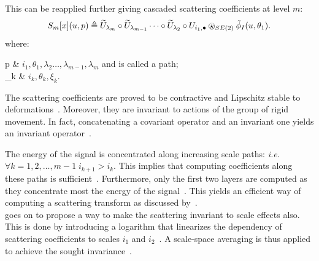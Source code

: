                     This can be reapplied further giving cascaded scattering coefficients at level $m$:
                    \begin{equation}
                        \label{eq::scatter_second}
                        S_m[x](u, p) \triangleq \widetilde{U}_{\lambda_m} \circ \widetilde{U}_{\lambda_{m-1}} \dots \circ \widetilde{U}_{\lambda_2} \circ U_{i_1, \bullet} \ostar_{SE(2)} \tilde{\phi}_I(u, \theta_1).
                    \end{equation}
                    where:
                    \begin{conditions}
                        p & $i_1, \theta_1, \lambda_2 \dots, \lambda_{m-1}, \lambda_m$ and is called a path;\\
                        \lambda_k & $i_k, \theta_k, \xi_k$.
                    \end{conditions}

                    The scattering coefficients are proved to be contractive and Lipschitz stable to deformations~\parencite{mallat2012group}.
                    Moreover, they are invariant to actions of the group of rigid movement.
                    In fact, concatenating a covariant operator and an invariant one yields an invariant operator~\parencite{mallat2012group,sifre2013rotation}.

                    The energy of the signal is concentrated along increasing scale paths: \textit{i.e.} $\forall k=1,2,\dots,m-1 \; i_{k+1} > i_k$.
                    This implies that computing coefficients along these paths is sufficient~\parencite{bruna2013invariant,sifre2013rotation,oyallon2015deep}.
                    Furthermore, only the first two layers are computed as they concentrate most the energy of the signal~\parencite{bruna2013invariant,sifre2013rotation,oyallon2015deep}.
                    This yields an efficient way of computing a scattering transform as discussed by~\textcite{sifre2013rotation,oyallon2015deep}.\\

                    \textcite{sifre2013rotation} goes on to propose a way to make the scattering invariant to scale effects also.
                    This is done by introducing a logarithm that linearizes the dependency of scattering coefficients to scales $i_1$ and $i_2$~\parencite{sifre2013rotation,oyallon2015deep}.
                    A scale-space averaging is thus applied to achieve the sought invariance~\parencite{sifre2013rotation}.\\

